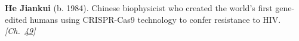 \textbf{He Jiankui} (b. 1984). Chinese biophysicist who created the world's first gene-edited humans using CRISPR-Cas9 technology to confer resistance to HIV. \emph{[Ch.~\hyperref[ch:ivfmtdna]{49}]}

